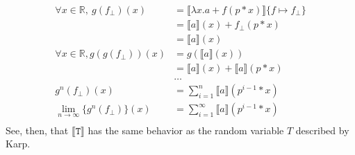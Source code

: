 \documentclass{westhesis}
\newcommand{\R}{\mathbb{R}}
\begin{document}
 \begin{align*}
 \forall x \in \R, \ g(f_{\perp})(x) &= \llbracket \lambda x.a + f(p*x)\rrbracket\{f \mapsto f_{\perp}\} \\
 &= \llbracket a \rrbracket(x) + f_{\perp}(p*x) \\
 &= \llbracket a \rrbracket(x)  \\
 \forall x \in \R, g(g(f_{\perp}))(x) &= g(\llbracket a \rrbracket(x)) \\
 &= \llbracket a \rrbracket(x) + \llbracket a \rrbracket(p*x) \\
 &\ldots \\
 g^n(f_{\perp})(x) &= \sum_{i=1}^{n} \llbracket a \rrbracket (p^{i-1}*x) \\
 \lim_{n \to \infty}\{g^n (f_{\perp})\}(x) &= \sum_{i=1}^{\infty} \llbracket a \rrbracket (p^{i-1}*x) \\
 \end{align*}
 See, then, that $\llbracket \texttt{T} \rrbracket$ has the same behavior as the random variable $T$ described by Karp.
\end{document}
